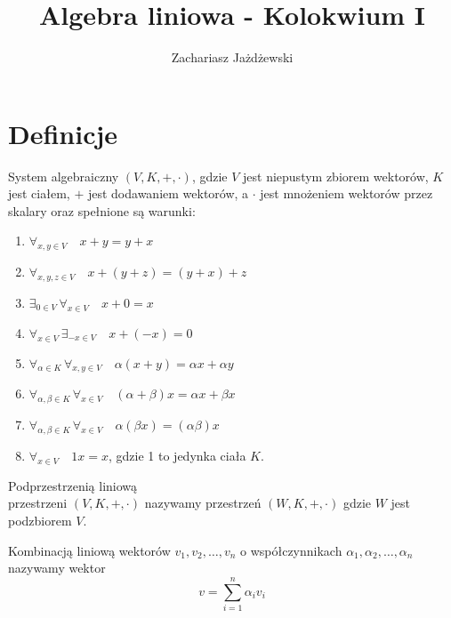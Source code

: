 \documentclass[a4paper,12pt]{article}
\title{Algebra liniowa - Kolokwium I}
\author{Zachariasz Jażdżewski}
\begin{document}
\maketitle


\section{Definicje}
\hfill

\begin{definition}
	System algebraiczny $(V,K,+,\cdot)$, gdzie $V$ jest niepustym zbiorem wektorów, $K$ jest ciałem, $+$ jest dodawaniem wektorów, a $\cdot$ jest mnożeniem wektorów przez skalary oraz spełnione są warunki:
	\begin{enumerate} 
		\item $\forall_{x,y \in V}\quad x+y = y+x$
		\item $\forall_{x,y,z \in V}\quad x+(y+z) = (y+x)+z$
		\item $\exists_{0 \in V}\, \forall_{x \in V}\quad x+0=x$
		\item $\forall_{x \in V}\, \exists_{-x \in V}\quad x+(-x) = 0$
		\item $\forall_{\alpha \in K}\, \forall_{x,y \in V}\quad \alpha(x+y) = \alpha x + \alpha y$
		\item $\forall_{\alpha, \beta \in K}\, \forall_{x \in V}\quad (\alpha + \beta )x = \alpha x + \beta x$
		\item $\forall_{\alpha, \beta \in K}\, \forall_{x \in V}\quad \alpha (\beta x) = (\alpha \beta)x$
		\item $\forall_{x \in V}\quad 1x = x$, gdzie 1 to jedynka ciała $K$.   
	\end{enumerate}
\end{definition}

\begin{definition}
	Podprzestrzenią liniową \\ przestrzeni $(V,K,+,\cdot)$ nazywamy przestrzeń $(W,K,+,\cdot)$ gdzie $W$ jest podzbiorem $V$. 
\end{definition}

\begin{definition}
	Kombinacją liniową wektorów $v_1, v_2, \dots, v_n$ o współczynnikach $\alpha_1, \alpha_2, \dots, \alpha_n$ nazywamy wektor
	\[
		v = \sum_{i=1}^{n} \alpha_i v_i 
	\]  
\end{definition}
\end{document}
